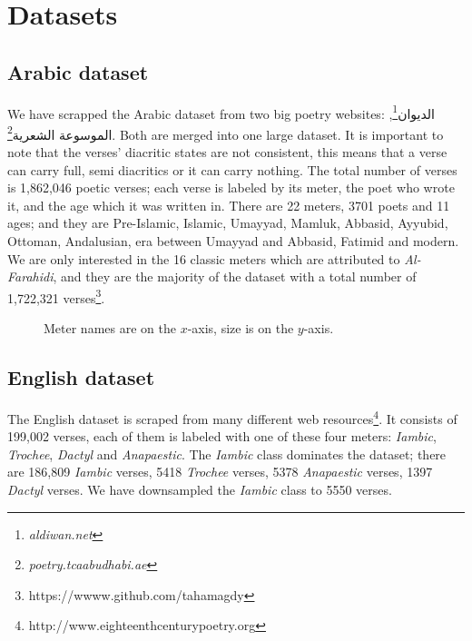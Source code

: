 \documentclass[12pt]{report}
\begin{document}



\section{Datasets}
\subsection{Arabic dataset}
We have scrapped the Arabic dataset from two big poetry websites:
\textarabic{الديوان}\footnote{\textit{aldiwan.net}}, \textarabic{الموسوعة
الشعرية}\footnote{\textit{poetry.tcaabudhabi.ae}}. Both are merged into one large
dataset. It is important to note that the verses' diacritic states are not
consistent, this means that a verse can carry full, semi diacritics or it can
carry nothing. The total number of verses is  1,862,046 poetic verses; each verse is
labeled by its meter, the poet who wrote it, and the
age which it was written in. There are 22 meters, 3701 poets and 11
ages; and they are Pre-Islamic, Islamic, Umayyad, Mamluk, Abbasid, Ayyubid, Ottoman,
Andalusian, era between Umayyad and Abbasid, Fatimid and modern.  We are only
interested  in the 16 classic meters which are attributed to \textit{Al-Farahidi},
and they are the majority of the dataset with a total number of 1,722,321
verses\footnote{https://wwww.github.com/tahamagdy}.


\begin{figure}
\centering


\caption{Meter names are on the $x$-axis, size  is on the $y$-axis.}
\label{data_size}
\end{figure}


\subsection{English dataset}
The English dataset is scraped from many different web
resources\footnote{http://www.eighteenthcenturypoetry.org}. It consists of 199,002
verses, each of them is labeled with one of these four meters: \textit{Iambic},
\textit{Trochee}, \textit{Dactyl} and \textit{Anapaestic}.  The \textit{Iambic}
class dominates the dataset; there are  186,809 \textit{Iambic} verses, 5418
\textit{Trochee} verses, 5378  \textit{Anapaestic} verses, 1397 \textit{Dactyl}
verses.  We have downsampled the \textit{Iambic} class to 5550 verses.
\end{document}

